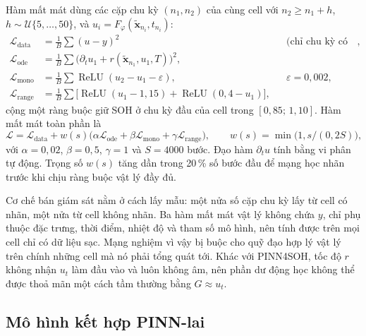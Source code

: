 Hàm mất mát dùng các cặp chu kỳ $(n_1, n_2)$ của cùng cell với $n_2 \ge n_1 + h$, $h \sim \mathcal{U}\{5, \dots, 50\}$, và
$u_i = F_\varphi(\tilde{\mathbf{x}}_{n_i}, t_{n_i})$:
\begin{align}
\mathcal{L}_\text{data} &= \tfrac{1}{B}\textstyle\sum (u - y)^2 && \text{(chỉ chu kỳ có nhãn)},\\
\mathcal{L}_\text{ode} &= \tfrac{1}{B}\textstyle\sum \big(\partial_t u_1 + r(\tilde{\mathbf{x}}_{n_1}, u_1, T)\big)^2, \\
\mathcal{L}_\text{mono} &= \tfrac{1}{B}\textstyle\sum \operatorname{ReLU}(u_2 - u_1 - \varepsilon), && \varepsilon = 0{,}002,\\
\mathcal{L}_\text{range} &= \tfrac{1}{B}\textstyle\sum \big[\operatorname{ReLU}(u_1 - 1{,}15) + \operatorname{ReLU}(0{,}4 - u_1)\big],
\end{align}
cộng một ràng buộc giữ SOH ở chu kỳ đầu của cell trong $[0{,}85;\,1{,}10]$. Hàm mất mát toàn phần là
\begin{equation}
\mathcal{L} = \mathcal{L}_\text{data} + w(s)\big(\alpha\mathcal{L}_\text{ode} + \beta\mathcal{L}_\text{mono}
+ \gamma\mathcal{L}_\text{range}\big), \qquad w(s) = \min\big(1, s/(0{,}2S)\big),
\end{equation}
với $\alpha = 0{,}02$, $\beta = 0{,}5$, $\gamma = 1$ và $S = 4000$ bước. Đạo hàm $\partial_t u$ tính bằng vi phân tự động.
Trọng số $w(s)$ tăng dần trong 20\,\% số bước đầu để mạng học nhãn trước khi chịu ràng buộc vật lý đầy đủ.

Cơ chế bán giám sát nằm ở cách lấy mẫu: một nửa số cặp chu kỳ lấy từ cell có nhãn, một nửa từ cell không nhãn. Ba hàm
mất mát vật lý không chứa $y$, chỉ phụ thuộc đặc trưng, thời điểm, nhiệt độ và tham số mô hình, nên tính được trên mọi cell
chỉ có dữ liệu sạc. Mạng nghiệm vì vậy bị buộc cho quỹ đạo hợp lý vật lý trên chính những cell mà nó phải tổng quát tới.
Khác với PINN4SOH, tốc độ $r$ không nhận $u_t$ làm đầu vào và luôn không âm, nên phần dư động học không thể được thoả
mãn một cách tầm thường bằng $G \approx u_t$.

\subsection{Mô hình kết hợp PINN-lai}\label{sec:pinnlai}

